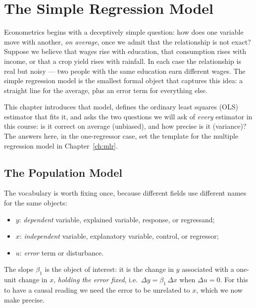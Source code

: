 \chapter{The Simple Regression Model}
\label{ch:slr}

Econometrics begins with a deceptively simple question: how does one variable move with another, \emph{on average}, once we admit that the relationship is not exact? Suppose we believe that wages rise with education, that consumption rises with income, or that a crop yield rises with rainfall. In each case the relationship is real but noisy --- two people with the same education earn different wages. The simple regression model is the smallest formal object that captures this idea: a straight line for the average, plus an error term for everything else.

This chapter introduces that model, defines the ordinary least squares (OLS) estimator that fits it, and asks the two questions we will ask of \emph{every} estimator in this course: is it correct on average (unbiased), and how precise is it (variance)? The answers here, in the one-regressor case, set the template for the multiple regression model in Chapter~\ref{ch:mlr}.

\section{The Population Model}


The vocabulary is worth fixing once, because different fields use different names for the same objects:
\begin{itemize}
    \item $y$: \emph{dependent} variable, explained variable, response, or regressand;
    \item $x$: \emph{independent} variable, explanatory variable, control, or regressor;
    \item $u$: \emph{error} term or disturbance.
\end{itemize}

The slope $\beta_1$ is the object of interest: it is the change in $y$ associated with a one-unit change in $x$, \emph{holding the error fixed}, i.e.\ $\Delta y = \beta_1 \, \Delta x$ when $\Delta u = 0$. For this to have a causal reading we need the error to be unrelated to $x$, which we now make precise.

